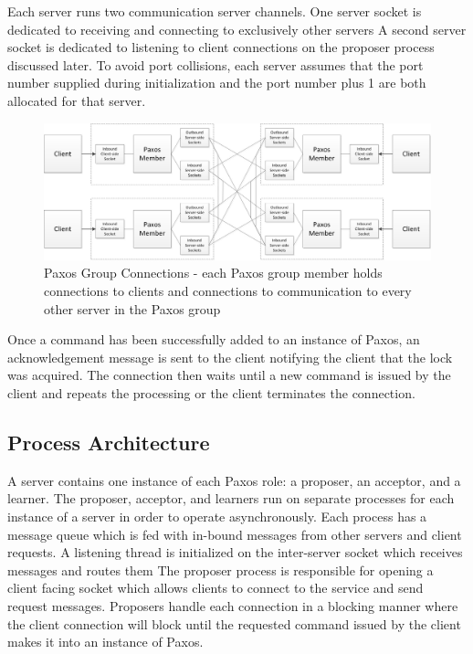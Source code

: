 \documentclass{article}
\begin{document}
Each server runs two communication server channels.
One server socket is dedicated to receiving and connecting to exclusively other servers
A second server socket is dedicated to listening to client connections on the proposer process discussed later.
To avoid port collisions, each server assumes that the port number supplied during initialization and the port number plus 1 are both allocated for that server.

\begin{figure}
\centering
\includegraphics[width=6in]{paxos_group_connections.jpg}
\caption{Paxos Group Connections - each Paxos group member holds connections to clients and connections to communication to every other server in the Paxos group} 
\end{figure}

Once a command has been successfully added to an instance of Paxos, an acknowledgement message is sent to the client notifying the client that the lock was acquired. The connection then waits until a new command is issued by the client and repeats the processing or the client terminates the connection.

\subsection{Process Architecture}

A server contains one instance of each Paxos role: a proposer, an acceptor, and a learner.
The proposer, acceptor, and learners run on separate processes for each instance of a server in order to operate asynchronously.
Each process has a message queue which is fed with in-bound messages from other servers and client requests.
A listening thread is initialized on the inter-server socket which receives messages and routes them
The proposer process is responsible for opening a client facing socket which allows clients to connect to the service and send request messages.
Proposers handle each connection in a blocking manner where the client connection will block until the requested command issued by the client makes it into an instance of Paxos.
\end{document}

